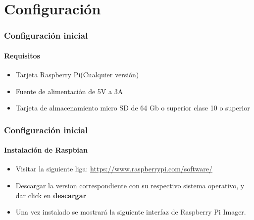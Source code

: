 \documentclass{beamer}
\begin{document}
	\section{Configuración}
	\begin{frame}
		\frametitle{Configuración inicial}
		\framesubtitle{Requisitos}
		
		\begin{tcolorbox}[enhanced, title= Material necesario:]
			\begin{itemize}
				\item Tarjeta Raspberry Pi(Cualquier versión)
				\item Fuente de alimentación de 5V a 3A
				\item Tarjeta de almacenamiento micro SD de 64 Gb o superior clase 10 o superior
			\end{itemize}
		\end{tcolorbox}
		
			
	\end{frame}

	\begin{frame}
		\frametitle{Configuración inicial}
		\framesubtitle{Instalación de Raspbian}
		
		\begin{tcolorbox}[enhanced, title= Instrucciones:]
				\begin{itemize}
					\item Visitar la siguiente liga: \url{https://www.raspberrypi.com/software/}
					\item Descargar la version correspondiente con su respectivo sistema operativo, y dar click en \textbf{descargar}
					\item Una vez instalado se mostrará la siguiente interfaz de Raspberry Pi Imager.
				\end{itemize}
		\end{tcolorbox}
		
		
	\end{frame}
	
\end{document}
